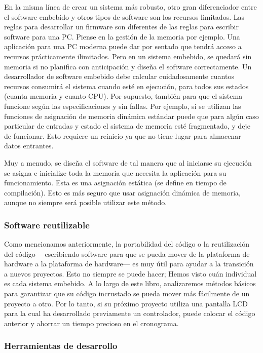 \documentclass[output=paper, 
colorlinks,
citecolor=brown,
newtxmath
]{langscibook}
\begin{document}
En la misma línea de crear un sistema más robusto, otro gran diferenciador entre el software embebido y otros tipos de software son los recursos limitados. 
Las reglas para desarrollar un firmware son diferentes de las reglas para 
escribir software para una PC. Piense en la gestión de la memoria por ejemplo.
Una aplicación para una PC moderna puede dar por sentado que tendrá acceso a recursos prácticamente ilimitados. Pero en un sistema embebido, se quedará sin memoria si no planifica con anticipación y diseña el software correctamente.
Un desarrollador de software embebido debe calcular cuidadosamente cuantos
recursos consumirá el sistema cuando esté en ejecución, para todos sus estados
(cuanta memoria y cuanto CPU).
Por supuesto, también para que el sistema funcione según 
las especificaciones y sin fallas. Por ejemplo, 
si se utilizan las funciones de asignación de memoria dinámica 
estándar puede que para algún caso particular de entradas
y estado el sistema de memoria esté fragmentado, y deje de funcionar.
Esto requiere un reinicio ya que no tiene lugar para almacenar datos entrantes.

Muy a menudo, se diseña el software de tal manera que al iniciarse
su ejecución se asigna e inicialize toda la memoria que necesita la aplicación
para su funcionamiento. Esta es una asignación estática (se define
en tiempo de compilación).
Esto es más seguro que usar asignación dinámica de memoria, 
aunque no siempre será posible utilizar este método.




\subsubsection {Software reutilizable}

Como mencionamos anteriormente, la portabilidad del código o la reutilización del código —escribiendo software para que se pueda mover de la plataforma de hardware a la plataforma de hardware— es muy útil para ayudar a la transición a nuevos proyectos. Esto no siempre se puede hacer; Hemos visto cuán individual es cada sistema embebido. A lo largo de este libro, analizaremos métodos básicos para garantizar que su código incrustado se pueda mover más fácilmente de un proyecto a otro. Por lo tanto, si su próximo proyecto utiliza una pantalla LCD para la cual ha desarrollado previamente un controlador, puede colocar el código anterior y ahorrar un tiempo precioso en el cronograma.



\subsubsection {Herramientas de desarrollo}
\end{document}
